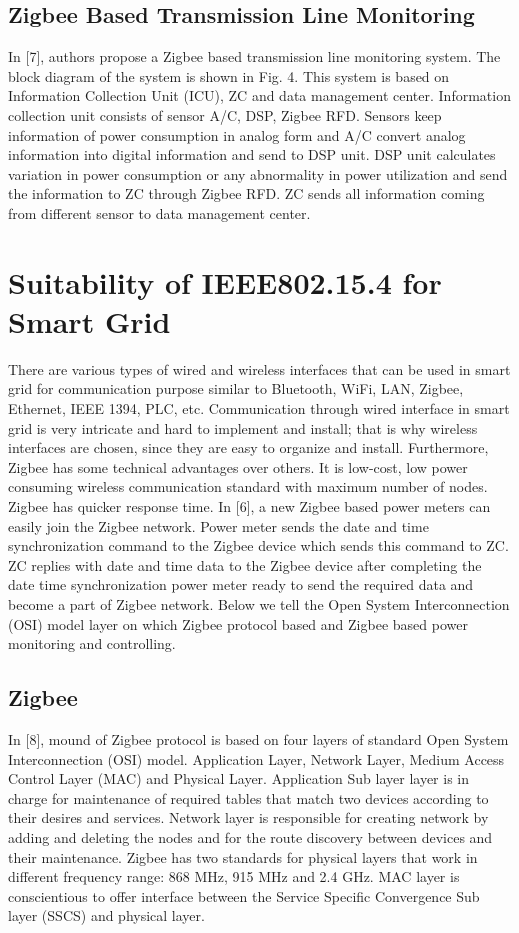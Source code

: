 \documentclass[10pt, conference, compsocconf]{IEEEtran}
\begin{document}
\subsection{Zigbee Based Transmission Line Monitoring}
In [7], authors propose a Zigbee based transmission line monitoring system. The block diagram of the system is shown in Fig. 4. This system is based on Information Collection Unit (ICU), ZC and data management center. Information collection unit consists of sensor A/C, DSP, Zigbee RFD. Sensors keep information of power consumption in analog form and A/C convert analog information into digital information and send to DSP unit. DSP unit calculates variation in power consumption or any abnormality in power utilization and send the information to ZC through Zigbee RFD. ZC sends all information coming from different sensor to data management center.

\section{Suitability of IEEE802.15.4 for Smart Grid}
There are various  types of wired and wireless interfaces that can be used in smart grid for communication purpose similar to Bluetooth, WiFi, LAN, Zigbee, Ethernet, IEEE 1394, PLC, etc. Communication through wired interface in smart grid is very intricate and hard to implement and install; that is why wireless interfaces are chosen, since they are easy to organize and install. Furthermore, Zigbee has some technical advantages over others. It is low-cost, low power consuming wireless communication standard with maximum number of nodes. Zigbee has quicker response time. In [6], a new Zigbee based  power meters can easily join the Zigbee network. Power meter sends the date and time synchronization command to the Zigbee device which sends this command to ZC. ZC replies with date and time data to the Zigbee device after completing the date time synchronization power meter ready to send the required data and become a part of Zigbee network. Below we tell the Open System Interconnection (OSI) model layer on which Zigbee protocol based and Zigbee based power monitoring and controlling.

\subsection{Zigbee}
In [8], mound of Zigbee protocol is based on four layers of standard Open System Interconnection (OSI) model. Application Layer, Network Layer, Medium Access Control Layer (MAC) and Physical Layer. Application Sub layer layer is in charge for maintenance of required tables that match two devices according to their desires and services. Network layer is responsible for creating network by adding and deleting the nodes and for the route discovery between devices and their maintenance. Zigbee has two standards for physical layers that work in different frequency range: 868 MHz, 915 MHz and 2.4 GHz. MAC layer is conscientious to offer interface between the Service Specific Convergence Sub layer (SSCS) and physical layer.
\end{document}
